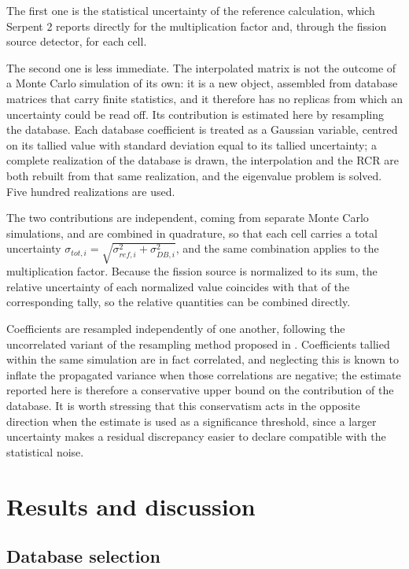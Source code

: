 \documentclass[preprint,review,12pt]{elsarticle}
\begin{document}
The first one is the statistical uncertainty of the reference calculation, which Serpent 2 reports directly for the multiplication factor and, through the fission source detector, for each cell.

The second one is less immediate. The interpolated matrix is not the outcome of a Monte Carlo simulation of its own: it is a new object, assembled from database matrices that carry finite statistics, and it therefore has no replicas from which an uncertainty could be read off. Its contribution is estimated here by resampling the database. Each database coefficient is treated as a Gaussian variable, centred on its tallied value with standard deviation equal to its tallied uncertainty; a complete realization of the database is drawn, the interpolation and the RCR are both rebuilt from that same realization, and the eigenvalue problem is solved. Five hundred realizations are used.

The two contributions are independent, coming from separate Monte Carlo simulations, and are combined in quadrature, so that each cell carries a total uncertainty $\sigma_{tot,i} = \sqrt{\sigma_{ref,i}^{2} + \sigma_{DB,i}^{2}}$, and the same combination applies to the multiplication factor. Because the fission source is normalized to its sum, the relative uncertainty of each normalized value coincides with that of the corresponding tally, so the relative quantities can be combined directly.

Coefficients are resampled independently of one another, following the uncorrelated variant of the resampling method proposed in \cite{Walters_uncertainty}. Coefficients tallied within the same simulation are in fact correlated, and neglecting this is known to inflate the propagated variance when those correlations are negative; the estimate reported here is therefore a conservative upper bound on the contribution of the database. It is worth stressing that this conservatism acts in the opposite direction when the estimate is used as a significance threshold, since a larger uncertainty makes a residual discrepancy easier to declare compatible with the statistical noise.

\endgroup

\section{Results and discussion} \label{section:Results and discussion}

\subsection{Database selection}
\end{document}
